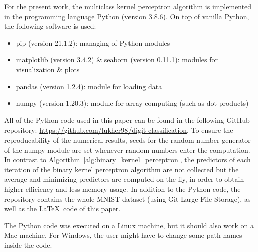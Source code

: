For the present work, the multiclass kernel perceptron algorithm is implemented in the programming language Python (version 3.8.6).
On top of vanilla Python, the following software is used:
\begin{itemize}
	\item pip (version 21.1.2): managing of Python modules 
	\item matplotlib (version 3.4.2) \& seaborn (version 0.11.1): modules for visualization \& plots
	\item pandas (version 1.2.4): module for loading data
	\item numpy (version 1.20.3): module for array computing (such as dot products)
\end{itemize}
All of the Python code used in this paper can be found in the following GitHub repository: \url{https://github.com/lukher98/digit-classification}. To ensure the reproducability of the numerical results, seeds for the random number generator of the numpy module are set whenever random numbers enter the computation. In contrast to Algorithm~\ref{alg:binary_kernel_perceptron}, the predictors of each iteration of the binary kernel perceptron algorithm are not collected but the average and minimizing predictors are computed on the fly, in order to obtain higher efficiency and less memory usage.
In addition to the Python code, the repository contains the whole MNIST dataset (using Git Large File Storage), as well as the \LaTeX\ code of this paper.

The Python code was executed on a Linux machine, but it should also work on a Mac machine. For Windows, the user might have to change some path names inside the code.